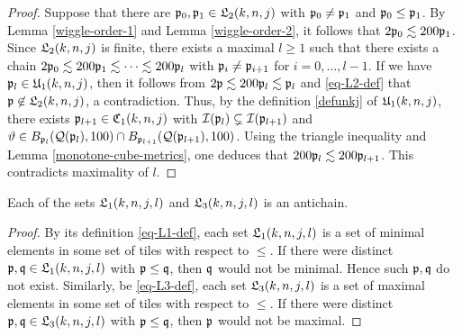 {\begin{proof}
    Suppose that there are ${\mathfrak p}_0, {\mathfrak p}_1 \in {\mathfrak L}_2(k,n,j)$ with ${\mathfrak p}_0 \ne {\mathfrak p}_1$ and ${\mathfrak p}_0 \le {\mathfrak p}_1$. By Lemma \ref{wiggle-order-1} and Lemma \ref{wiggle-order-2}, it follows that $2{\mathfrak p}_0 \lesssim 200{\mathfrak p}_1$. Since ${\mathfrak L}_2(k,n,j)$ is finite, there exists a maximal $l \ge 1$ such that there exists a chain $2{\mathfrak p}_0 \lesssim 200 {\mathfrak p}_1 \lesssim \dotsb \lesssim 200 {\mathfrak p}_l$ with ${\mathfrak p}_i \ne {\mathfrak p}_{i+1}$ for $i = 0, \dotsc, l-1$.
    If we have ${\mathfrak p}_l \in {\mathfrak U}_1(k,n,j)$, then it follows from $2{\mathfrak p} \lesssim 200 {\mathfrak p}_l \lesssim {\mathfrak p}_l$ and \eqref{eq-L2-def} that ${\mathfrak p} \not\in {\mathfrak L}_2(k,n,j)$, a contradiction. Thus, by the definition \eqref{defunkj}  of ${\mathfrak U}_1(k,n,j)$, there exists ${\mathfrak p}_{l+1} \in {\mathfrak C}_1(k,n,j)$ with ${\mathcal{I}}({\mathfrak p}_l) \subsetneq {\mathcal{I}}({\mathfrak p}_{l+1}) $ and ${\vartheta} \in B_{{\mathfrak p}_l}({\mathcal{Q}}({\mathfrak p}_l), 100) \cap B_{{\mathfrak p}_{l+1}}({\mathcal{Q}}({\mathfrak p}_{l+1}), 100)$. Using the triangle inequality and Lemma \ref{monotone-cube-metrics}, one deduces that $200 {\mathfrak p}_l \lesssim 200{\mathfrak p}_{l+1}$. This contradicts maximality of $l$.
\end{proof}

\begin{lemma}[L1 L3 antichain]
\label{L1-L3-antichain}
    Each of the sets ${\mathfrak L}_1(k,n,j,l)$ and ${\mathfrak L}_3(k,n,j,l)$ is an antichain.
\end{lemma}

\begin{proof}
    By its definition \eqref{eq-L1-def}, each set ${\mathfrak L}_1(k,n,j,l)$ is a set of minimal elements in some set of tiles with respect to $\le$. If there were distinct ${\mathfrak p}, {\mathfrak q} \in {\mathfrak L}_1(k,n,j,l)$ with ${\mathfrak p} \le {\mathfrak q}$, then ${\mathfrak q}$ would not be minimal. Hence such ${\mathfrak p}, {\mathfrak q}$ do not exist. Similarly, be \eqref{eq-L3-def}, each set ${\mathfrak L}_3(k,n,j,l)$ is a set of maximal elements in some set of tiles with respect to $\le$. If there were distinct ${\mathfrak p}, {\mathfrak q} \in {\mathfrak L}_3(k,n,j,l)$ with ${\mathfrak p} \le {\mathfrak q}$, then ${\mathfrak p}$ would not be maximal.
\end{proof}

}
